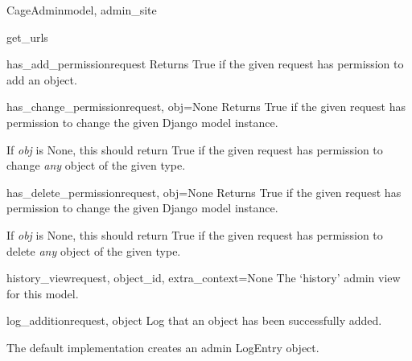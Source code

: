 \documentclass[letterpaper,10pt,english]{sphinxmanual}
\begin{document}
\begin{classdesc}{CageAdmin}{model, admin\_site}
\hypertarget{animal.admin.CageAdmin.get_urls}{}\begin{methoddesc}{get\_urls}{}\end{methoddesc}

\hypertarget{animal.admin.CageAdmin.has_add_permission}{}\begin{methoddesc}{has\_add\_permission}{request}
Returns True if the given request has permission to add an object.
\end{methoddesc}

\hypertarget{animal.admin.CageAdmin.has_change_permission}{}\begin{methoddesc}{has\_change\_permission}{request, obj=None}
Returns True if the given request has permission to change the given
Django model instance.

If \emph{obj} is None, this should return True if the given request has
permission to change \emph{any} object of the given type.
\end{methoddesc}

\hypertarget{animal.admin.CageAdmin.has_delete_permission}{}\begin{methoddesc}{has\_delete\_permission}{request, obj=None}
Returns True if the given request has permission to change the given
Django model instance.

If \emph{obj} is None, this should return True if the given request has
permission to delete \emph{any} object of the given type.
\end{methoddesc}

\hypertarget{animal.admin.CageAdmin.history_view}{}\begin{methoddesc}{history\_view}{request, object\_id, extra\_context=None}
The `history' admin view for this model.
\end{methoddesc}

\hypertarget{animal.admin.CageAdmin.log_addition}{}\begin{methoddesc}{log\_addition}{request, object}
Log that an object has been successfully added.

The default implementation creates an admin LogEntry object.
\end{methoddesc}


\end{classdesc}
\end{document}
